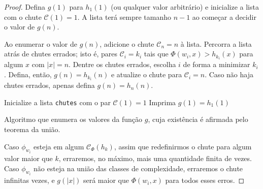 \begin{proof}
    Defina $g(1)$ para $h_1(1)$
    (ou qualquer valor arbitrário)
    e inicialize a lista com o chute
    $\mathcal C(1) = 1$.
    A lista terá sempre tamanho $n-1$
    ao começar a decidir o valor de $g(n)$.

    Ao enumerar o valor de $g(n)$,
    adicione o chute $\mathcal C_n = n$ à lista.
    Percorra a lista atrás de chutes errados;
    isto é,
    pares $\mathcal C_i = k_i$
    tais que $\Phi(w_i, x) > h_{k_i}(x)$
    para algum $x$ com $|x| = n$.
    Dentre os chutes errados,
    escolha $i$ de forma a minimizar $k_i$.
    Defina, então, $g(n) = h_{k_i}(n)$
    e atualize o chute para $\mathcal C_i = n$.
    Caso não haja chutes errados,
    apenas defina $g(n) = h_n(n)$.

    \begin{algorithm}[h]
        Inicialize a lista \texttt{chutes} com o par $\mathcal C(1) = 1$ \;
        Imprima $g(1) = h_1(1)$ \;
        \caption{
            Algoritmo que enumera os valores da função $g$,
            cuja existência é afirmada pelo teorema da união.
        }
        \label{algo:union_theorem}
    \end{algorithm}

    Caso $\phi_{w_i}$ esteja em algum $\mathcal C_\Phi(h_k)$,
    assim que redefinirmos o chute para algum valor maior que $k$,
    erraremos, no máximo,
    mais uma quantidade finita de vezes.
    Caso $\phi_{w_i}$ não esteja na união das classes de complexidade,
    erraremos o chute infinitas vezes,
    e $g(|x|)$ será maior que $\Phi(w_i, x)$ para todos esses erros.


\end{proof}

